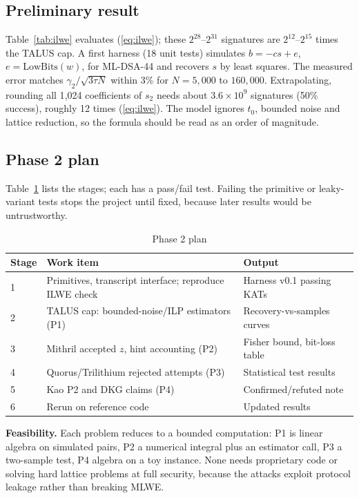 \documentclass[10pt,conference,a4paper]{IEEEtran}
\newcommand{\LB}{\mathrm{LowBits}}
\begin{document}
\subsection{Preliminary result}\label{sec:prelim}
Table~\ref{tab:ilwe} evaluates (\ref{eq:ilwe}); these $2^{28}$--$2^{31}$ signatures are $2^{12}$--$2^{15}$ times the
TALUS cap. A first harness (18 unit tests) simulates $b=-cs+e$, $e=\LB(w)$, for ML-DSA-44 and recovers $s$ by least
squares. The measured error matches $\gamma_2/\sqrt{3\tau N}$ within 3\% for $N=5{,}000$ to $160{,}000$. Extrapolating,
rounding all 1{,}024 coefficients of $s_2$ needs about $3.6\times10^9$ signatures (50\% success), roughly 12 times
(\ref{eq:ilwe}). The model ignores $t_0$, bounded noise and lattice reduction, so the formula should be read as an order
of magnitude.

\subsection{Phase 2 plan}
Table~\ref{tab:plan} lists the stages; each has a pass/fail test. Failing the primitive or leaky-variant tests stops
the project until fixed, because later results would be untrustworthy.

\begin{table}[t]
\caption{Phase 2 plan}\label{tab:plan}
\centering\footnotesize
\begin{tabularx}{\columnwidth}{@{}lXX@{}}
\toprule
Stage & Work item & Output\\
\midrule
1 & Primitives, transcript interface; reproduce ILWE check & Harness v0.1 passing KATs\\
2 & TALUS cap: bounded-noise/ILP estimators (P1) & Recovery-vs-samples curves\\
3 & Mithril accepted $z$, hint accounting (P2) & Fisher bound, bit-loss table\\
4 & Quorus/Trilithium rejected attempts (P3) & Statistical test results\\
5 & Kao P2 and DKG claims (P4) & Confirmed/refuted note\\
6 & Rerun on reference code & Updated results\\
\bottomrule
\end{tabularx}
\end{table}

\textbf{Feasibility.} Each problem reduces to a bounded computation: P1 is linear algebra on simulated pairs, P2 a
numerical integral plus an estimator call, P3 a two-sample test, P4 algebra on a toy instance. None needs proprietary
code or solving hard lattice problems at full security, because the attacks exploit protocol leakage rather than
breaking MLWE.
\end{document}
